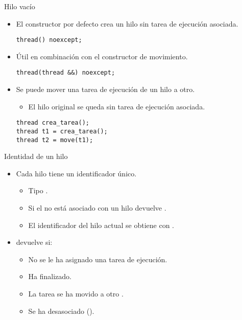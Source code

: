 \begin{frame}[fragile]{Hilo vacío}
\begin{itemize}
  \item El constructor por defecto crea un hilo sin tarea de ejecución asociada.
\begin{lstlisting}
thread() noexcept;
\end{lstlisting}
  \item Útil en combinación con el constructor de movimiento.
\begin{lstlisting}
thread(thread &&) noexcept;
\end{lstlisting}
  \item Se puede mover una tarea de ejecución de un hilo a otro.
    \begin{itemize}
      \item El hilo original se queda sin tarea de ejecución asociada.
    \end{itemize}
\begin{lstlisting}
thread crea_tarea();
thread t1 = crea_tarea();
thread t2 = move(t1);
\end{lstlisting}
\end{itemize}
\end{frame}

\begin{frame}{Identidad de un hilo}
\begin{itemize}
  \item Cada hilo tiene un identificador único.
    \begin{itemize}
      \item Tipo .
      \item Si el  no está asociado con un hilo  devuelve .
      \item El identificador del hilo actual se obtiene con .
    \end{itemize}
  \item {} devuelve  si:
    \begin{itemize}
      \item No se le ha asignado una tarea de ejecución.
      \item Ha finalizado.
      \item La tarea se ha movido a otro .
      \item Se ha desasociado ().
    \end{itemize}
\end{itemize}
\end{frame}

